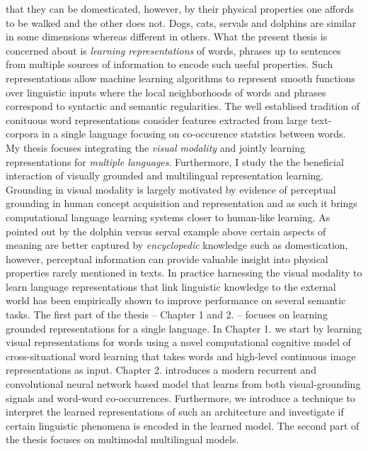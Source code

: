 that they can be domesticated, however, by their physical properties one affords to be walked
and the other does not. Dogs, cats, servals and dolphins are similar in some dimensions whereas
different in others.
What the present thesis is concerned about is \emph{learning representations}
of words, phrases up to sentences from multiple sources of information to encode such useful properties.
Such representations allow machine learning algorithms to represent smooth functions over linguistic
inputs where the local neighborhoods of words and phrases correspond to syntactic and semantic regularities.
The well establised tradition of conituous word representations consider features extracted
from large text-corpora in a single language focusing on co-occurence statstics between words.
My thesis focuses integrating the \emph{visual modality} and jointly learning representations for
\emph{multiple languages}. Furthermore, I study the the beneficial interaction of
visually grounded and multilingual representation learning.
Grounding in visual modality is largely motivated by evidence of
perceptual grounding in human concept acquisition and representation \cite{barsalou2003grounding} and as such
it brings computational language learning systems closer to human-like learning. As pointed out by the
dolphin versus serval example above certain aspects of meaning are better captured by \emph{encyclopedic}
knowledge such as domestication, however, perceptual information can provide valuable insight into
physical properties rarely mentioned in texts. In practice harnessing the visual modality to learn language
representations that link linguistic knowledge
to the external world \cite{kiela2014improving,baroni2016grounding,elliott2017imagination,kiela2017learning,yoo2017improving}
has been empirically shown to improve performance on several semantic tasks.
The first part of the thesis -- Chapter 1 and 2. -- focuses on learning grounded representations for a single language.
In Chapter 1. we start by learning visual representations for words using a novel computational
cognitive model of cross-situational word learning that takes words and high-level continuous image
representations as input. Chapter 2. introduces a modern recurrent and convolutional neural network based
model that learns from both visual-grounding signals and word-word co-occurrences.
Furthermore, we introduce a technique to interpret the learned representations of such an
architecture and investigate if certain linguistic phenomena is encoded in the learned model.
The second part of the thesis focuses on multimodal multilingual models.
